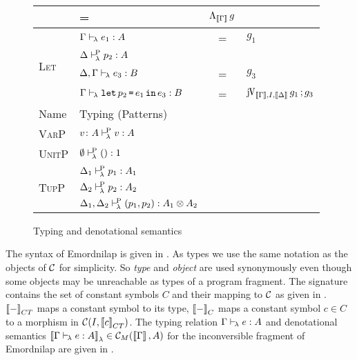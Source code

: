 \documentclass[runningheads,envcountsame]{llncs}
\newcommand{\monad}{M}
\begin{document}
\begin{figure}
{\begin{tabular}{l|l c l}
        & = & $\curry_{\sem{\Gamma}}\,g$
        \\ \hline
          \multirow{4}{*}{\textsc{Let}}
        & $\Gamma \vdash_{\!\lambda} e_1 : A$
        & = & $g_1$ \\
        & $\Delta \vdash^{\!\mathrm{P}}_{\!\lambda} p_2 : A$
        &  \\
        & $\Delta, \Gamma \vdash_{\!\lambda} e_3 : B$
        & = & $g_3$ \\ \cline{2-2}
        & $\Gamma \vdash_{\!\lambda} \texttt{let}\,p_2\,\texttt{=}\,e_1\,\texttt{in}\,e_3 : B$
        & = & $\comp{\juncurry_{\sem{\Gamma}, I, \sem{\Delta}}\,g_1}{g_3}$
        \\ \hline \hline
        Name & Typing (Patterns) \\ \hline
          \textsc{VarP}
        & $v\colon A \vdash^{\!\mathrm{P}}_{\!\lambda} v : A$
        \\ \hline
          \textsc{UnitP}
        & $\emptyset \vdash^{\!\mathrm{P}}_{\!\lambda} () : 1$
        \\ \hline
          \multirow{3}{*}{\textsc{TupP}}
        & $\Delta_1 \vdash^{\!\mathrm{P}}_{\!\lambda} p_1 : A_1$
        &  \\
        & $\Delta_2 \vdash^{\!\mathrm{P}}_{\!\lambda} p_2 : A_2$
        &  \\ \cline{2-2}
        & $\typerulelp{\Delta_1, \Delta_2}{\epair{p_1}{p_2}}{\tensor{A_1}{A_2}}$
        & 
        \\ \hline
    \end{tabular}}
    \caption{Typing and denotational semantics}
    \label{fig:semantics1}
\end{figure}


The syntax of Emordnilap is given in . As types we use the same notation as the objects of $\mathcal{C}$ for simplicity. So \emph{type} and \emph{object} are used synonymously even though some objects may be unreachable as types of a program fragment. The signature contains the set of constant symbols $C$ and their mapping to $\mathcal{C}$ as given in . $\sem{-}_{CT}$ maps a constant symbol to its type, $\sem{-}_C$ maps a constant symbol $c \in C$ to a morphism in $\C(I, \sem{c}_{CT})$. The typing relation $\Gamma \vdash_{\!\lambda} e : A$ and denotational semantics $\semL{\typerulel{\Gamma}{e}{A}} \in \C_\monad(\sem{\Gamma}, A)$ for the inconversible fragment of Emordnilap are given in .
\end{document}
